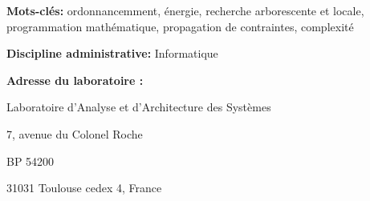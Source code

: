 \documentclass[11pt,a4paper,svgnames]{book}
\begin{document}
\noindent\hrulefill

{\bf Mots-clés: } ordonnancemment, énergie, recherche arborescente et
locale, programmation mathématique, propagation de
contraintes, complexité



\noindent\hrulefill

{\bf Discipline administrative: }Informatique

\noindent\hrulefill

{\bf Adresse du laboratoire :} 

Laboratoire d'Analyse et d'Architecture des Systèmes

7, avenue du Colonel Roche 

BP 54200 

31031 Toulouse cedex 4, France
\end{document}
